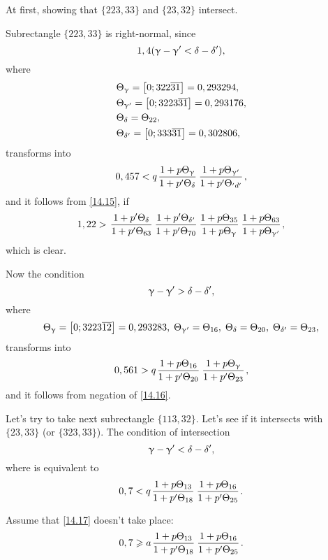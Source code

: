 At first, showing that $\{223, 33\}$ and $\{23, 32\}$ intersect.

Subrectangle $\{223, 33\}$ is right-normal, since
\begin{equation*}
	1,4 (\upgamma - \upgamma' < \delta - \delta'),
\end{equation*}
where
\begin{equation*}
	\begin{aligned}
		&\Theta_{\upgamma} = \left[0; 322 \overline{31}\right] = 0,293294,\\
		&\Theta_{\upgamma'} = \left[0; 3223\overline{31}\right] = 0,293176,\\
		&\Theta_{\delta} = \Theta_{22},\\
		&\Theta_{\delta'} = \left[0;333\overline{31}\right] = 0,302806,
	\end{aligned}
\end{equation*}
transforms into
\begin{equation*}
	0,457 < q \up{\g}{\d} \up{\g'}{'d'},
\end{equation*}
and it follows from \ref{14.15}, if
\begin{equation*}
	1,22 > \pp{\d}{63} \pp{\d'}{70} \uu{35}{\g} \uu{63}{\g'},
\end{equation*}
which is clear.

Now the condition
\begin{equation*}
	\upgamma - \upgamma' > \delta - \delta',
\end{equation*}
where
\begin{equation*}
	\Theta_{\upgamma} = \left[0; 3223\overline{12}\right] = 0,293283,\; \Theta_{\upgamma'} = \Theta_{16},\; \Theta_{\delta} = \Theta_{20},\; \Theta_{\delta'} = \Theta_{23},
\end{equation*}
transforms into
\begin{equation*}
	0,561 > q \up{16}{20} \up{\g}{23},
\end{equation*}
and it follows from negation of \ref{14.16}.

Let's try to take next subrectangle $\{113, 32\}$.
Let's see if it intersects with $\{23, 33\}$ (or $\{323, 33\}$).
The condition of intersection
\begin{equation*}
	\upgamma - \upgamma' < \delta - \delta',
\end{equation*}
where
is equivalent to
\begin{equation}\label{14.17}
	0,7 < q \up{13}{18} \up{16}{25}.
\end{equation}

Assume that \ref{14.17} doesn't take place:
\begin{equation}\label{14.18}
	0,7 \geqslant a \up{13}{18} \up{16}{25}.
\end{equation}

